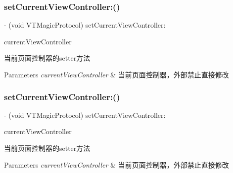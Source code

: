 \subsubsection{\texorpdfstring{set\+Current\+View\+Controller\+:()}{setCurrentViewController:()}\hspace{0.1cm}{\footnotesize\ttfamily [2/3]}}
{\footnotesize\ttfamily -\/ (void V\+T\+Magic\+Protocol) set\+Current\+View\+Controller\+: \begin{DoxyParamCaption}\item[{(U\+I\+View\+Controller $\ast$)}]{current\+View\+Controller }\end{DoxyParamCaption}\hspace{0.3cm}{\ttfamily [required]}}

当前页面控制器的setter方法


\begin{DoxyParams}{Parameters}
{\em current\+View\+Controller} & 当前页面控制器，外部禁止直接修改 \\
\hline
\end{DoxyParams}
\mbox{\label{protocol_v_t_magic_protocol_01-p_a2e54d402f3dcf7a12304b008debab60c}} 
\subsubsection{\texorpdfstring{set\+Current\+View\+Controller\+:()}{setCurrentViewController:()}\hspace{0.1cm}{\footnotesize\ttfamily [3/3]}}
{\footnotesize\ttfamily -\/ (void V\+T\+Magic\+Protocol) set\+Current\+View\+Controller\+: \begin{DoxyParamCaption}\item[{(U\+I\+View\+Controller $\ast$)}]{current\+View\+Controller }\end{DoxyParamCaption}\hspace{0.3cm}{\ttfamily [required]}}

当前页面控制器的setter方法


\begin{DoxyParams}{Parameters}
{\em current\+View\+Controller} & 当前页面控制器，外部禁止直接修改 \\
\hline
\end{DoxyParams}
\mbox{\label{protocol_v_t_magic_protocol_01-p_a4c56f62764bbc1306d593c7a940a117d}} 
